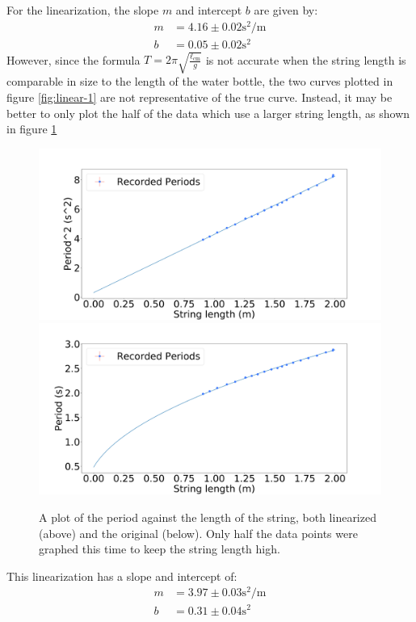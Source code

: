 \documentclass[%
 reprint,
 amsmath,amssymb
 aps,
]{revtex4-2}
\begin{document}
For the linearization, the slope $m$ and intercept $b$ are given by:
\begin{align}
    m &= 4.16 \pm 0.02 \si{\second\squared\per\meter} \\ 
    b &= 0.05 \pm 0.02 \si{\second\squared}
\end{align}
However, since the formula $T = 2\pi\sqrt{\frac{\ell_\text{cm}}{g}}$ is not accurate when the string length is comparable in size to the length of the water bottle, the two curves plotted in figure \ref{fig:linear-1} are not representative of the true curve. Instead, it may be better to only plot the half of the data which use a larger string length, as shown in figure \ref{fig:plot-2}
\begin{figure}[!h]
    \includegraphics[width=\linewidth]{Figures/linear_2.png}
    \includegraphics[width=\linewidth]{Figures/normal_2.png}

    \caption{A plot of the period against the length of the string, both linearized (above) and the original (below). Only half the data points were graphed this time to keep the string length high.}
    \label{fig:plot-2}
\end{figure}
This linearization has a slope and intercept of:
\begin{align}
    m &= 3.97 \pm 0.03 \si{\second\squared\per\meter} \\ 
    b &= 0.31 \pm 0.04 \si{\second\squared}
    \label{eq:}
\end{align}
\end{document}
